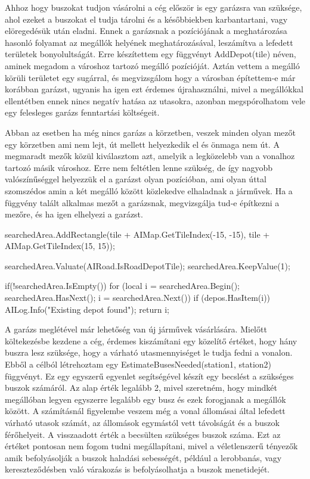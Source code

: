 Ahhoz hogy buszokat tudjon vásárolni a cég először is egy garázsra van szüksége, ahol ezeket a buszokat el tudja tárolni és a későbbiekben karbantartani, vagy elöregedésük után eladni. Ennek a garázsnak a pozíciójának a meghatározása hasonló folyamat az megállók helyének meghatározásával, leszámítva a lefedett területek bonyolultságát. Erre készítettem egy függvényt AddDepot(tile) néven, aminek megadom a városhoz tartozó megálló pozícióját. Aztán vettem a megálló körüli területet egy sugárral, és megvizsgálom hogy a városban építettem-e már korábban garázst, ugyanis ha igen ezt érdemes újrahasználni, mivel a megállókkal ellentétben ennek nincs negatív hatása az utasokra, azonban megspórolhatom vele egy felesleges garázs fenntartási költségeit.

Abban az esetben ha még nincs garázs a körzetben, veszek minden olyan mezőt egy körzetben ami nem lejt, út mellett helyezkedik el és önmaga nem út. A megmaradt mezők közül kiválasztom azt, amelyik a legközelebb van a vonalhoz tartozó másik városhoz. Erre nem feltétlen lenne szükség, de így nagyobb valószínűséggel helyezzük el a garázst olyan pozícióban, ami olyan úttal szomszédos amin a két megálló között közlekedve elhaladnak a járművek. Ha a függvény talált alkalmas mezőt a garázsnak, megvizsgálja tud-e építkezni a mezőre, és ha igen elhelyezi a garázst.

\begin{cpp}
searchedArea.AddRectangle(tile + AIMap.GetTileIndex(-15, -15),
 tile + AIMap.GetTileIndex(15, 15));

searchedArea.Valuate(AIRoad.IsRoadDepotTile);
searchedArea.KeepValue(1);

if(!searchedArea.IsEmpty()) {
  for (local i = searchedArea.Begin(); 
   searchedArea.HasNext(); i = searchedArea.Next()) {
    if (depos.HasItem(i)) {
      AILog.Info("Existing depot found");
      return i;
    }
  }
}
\end{cpp}

A garázs meglétével már lehetőség van új járművek vásárlására. Mielőtt költekezésbe kezdene a cég, érdemes kiszámítani egy közelítő értéket, hogy hány buszra lesz szüksége, hogy a várható utasmennyiséget le tudja fedni a vonalon. Ebből a célból létrehoztam egy EstimateBusesNeeded(station1, station2) függvényt. Ez egy egyszerű egyenlet segítségével készít egy becslést a szükséges buszok számáról. Az alap érték legalább 2, mivel szeretném, hogy mindkét megállóban legyen egyszerre legalább egy busz és ezek forogjanak a megállók között. A számításnál figyelembe veszem még a vonal állomásai által lefedett várható utasok számát, az állomások egymástól vett távolságát és a buszok férőhelyeit. A visszaadott érték a becsülten szükséges buszok száma. Ezt az értéket pontosan nem fogom tudni megállapítani, mivel a véletlenszerű tényezők amik befolyásolják a buszok haladási sebességét, például a lerobbanás, vagy kereszteződésben való várakozás is befolyásolhatja a buszok menetidejét.

